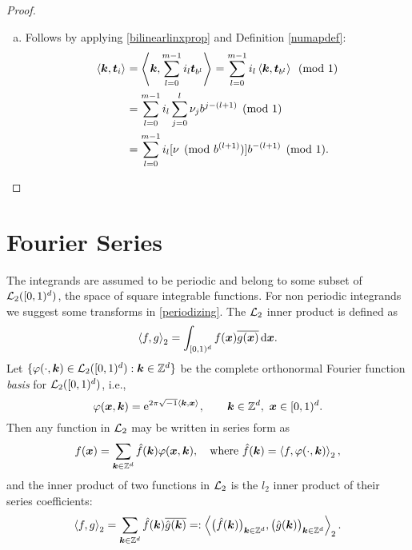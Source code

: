 \documentclass[graybox,footinfo]{svmult}
\newcommand{\Z}{\mathbb{Z}} %
\newcommand{\bst}{\boldsymbol{t}}    %
\newcommand{\bsx}{\boldsymbol{x}}    %
\begin{document}
\begin{proof}
\begin{enumerate}[a)]
\item Follows by applying  \eqref{bilinearlinxprop} and Definition \ref{numapdef}:
\begin{align*}
\ip{\bsk}{\bst_i} &= \ip{\bsk}{\sum_{l=0}^{m-1} i_l \bst_{b^{l}}} = \sum_{l=0}^{m-1} i_l \ip{\bsk}{\bst_{b^{l}}} \pmod 1 \\
& = \sum_{l=0}^{m-1} i_l \sum_{j=0}^{l} \nu_jb^{j-(l+1)} \pmod 1\\
&=\sum_{l=0}^{m-1} i_l [\nu \pmod  {b^{(l+1)}}]  b^{-(l+1)} \pmod 1.
\end{align*}

\end{enumerate}
\end{proof}

\section{Fourier Series}

The integrands are assumed to be periodic and belong to some subset of $\mathcal{L}_2([0,1)^d)$, the space of square integrable functions. For non periodic integrands we suggest some transforms in \eqref{periodizing}. The $\mathcal{L}_2$ inner product is defined as
\[
\ip[2]{f}{g} = \int_{\cube} f(\bsx) \overline{g(\bsx)} \, \dif \bsx.
\]
Let $\{\varphi(\cdot,\bsk) \in \cl_2(\cube) : \bsk \in \Z^d\}$ be the complete orthonormal Fourier function \emph{basis} for $\mathcal{L}_2([0,1)^d)$, i.e.,
\[
\varphi(\bsx,\bsk)  = \me^{2 \pi \sqrt{-1} \ip{\bsk}{\bsx}}, \qquad \bsk \in \Z^d, \ \bsx \in \cube.
\]
Then any function in $\mathcal{L}_2$ may be written in series form as
\begin{equation} \label{Fourierdef}
f(\bsx) = \sum_{\bsk \in \Z^d} \hf(\bsk) \varphi(\bsx,\bsk), \quad \text{where } \hf(\bsk) = \ip[2]{f}{\varphi(\cdot,\bsk)},
\end{equation}
and the inner product of two functions in $\mathcal{L}_2$ is the $l_2$ inner product of their series coefficients:
\[
\ip[2]{f}{g} = \sum_{\bsk \in \Z^d} \hf(\bsk)\overline{\hg(\bsk)} =: \ip[2]{\bigl(\hf(\bsk)\bigr)_{\bsk \in \Z^d}}{\bigl ( \hg(\bsk)\bigr )_{\bsk \in \Z^d}}.
\]
\end{document}
